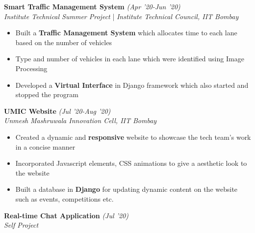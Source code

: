 \documentclass{article}
\begin{document}
\vspace{-2pt}

\large\textbf{Smart Traffic Management System} \hfill{ \normalsize\textit{(Apr '20-Jun '20)}}
\normalsize \\  \textit{Institute Technical Summer Project} | \textit{Institute Technical Council, IIT Bombay}

\vspace{-6pt}

\begin{itemize}[itemsep=-1mm, leftmargin=18pt]
	\item Built a \textbf{Traffic Management System} which allocates time to each lane based on the number of vehicles 
	\item Type and number of vehicles in each lane which were identified using Image Processing
	\item Developed a \textbf{Virtual Interface} in Django framework which also started and stopped the program
\end{itemize}

\raggedright

\vspace{-2pt}

\large\textbf{UMIC Website} \hfill{ \normalsize\textit{(Jul '20-Aug '20)}}
\normalsize \\  \textit{Unmesh Mashruwala Innovation Cell, IIT Bombay}

\vspace{-6pt}

\begin{itemize}[itemsep=-1mm, leftmargin=18pt]
	\item Created a dynamic and \textbf{responsive} website to showcase the tech team's work in a concise manner 
	\item Incorporated Javascript elements, CSS animations to give a aesthetic look to the website
	\item Built a database in \textbf{Django} for updating dynamic content on the website such as events, competitions etc.
\end{itemize}

\raggedright

\vspace{-2pt}

\large\textbf{Real-time Chat Application} \hfill{ \normalsize\textit{(Jul '20)}}
\normalsize \\  \textit{Self Project}

\vspace{-6pt}
\end{document}
